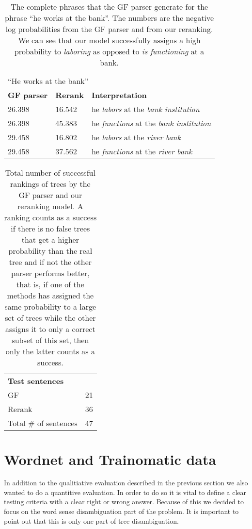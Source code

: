 \begin{table}[htbp]
\centering
\caption{The complete phrases that the GF parser generate for the phrase ``he works at the bank''. The numbers are the negative log probabilities from the GF parser and from our reranking. We can see that our model successfully assigns a high probability to \emph{laboring} as opposed to \emph{is functioning} at a bank.}
\label{tab:worksbank}
\begin{tabular}{lll}
\multicolumn{3}{l}{``He works at the bank''}\\
\textbf{GF parser} & \textbf{Rerank} & \textbf{Interpretation}\\
26.398 & 16.542 & he \emph{labors} at the \emph{bank institution}  \\
26.398 & 45.383 & he \emph{functions} at the \emph{bank institution}\\
29.458 & 16.802 & he \emph{labors} at the \emph{river bank} \\
29.458 & 37.562 & he \emph{functions} at the \emph{river bank}   
\end{tabular}
\end{table}

\begin{table}[htbp]
\centering
\caption{Total number of successful rankings of trees by the GF parser and our reranking model.  A ranking counts as a success if there is no false trees that get a higher probability than the real tree and if not the other parser performs better, that is, if one of the methods has assigned the same probability to a large set of trees while the other assigns it to only a correct subset of this set, then only the latter counts as a success.}
\label{tab:results_summary}
\begin{tabular}{ll}
\multicolumn{2}{l}{\bf Test sentences}\\
GF & 21 \\
Rerank & 36 \\
Total \# of sentences & 47   
\end{tabular}
\end{table}

\section{Wordnet and Trainomatic data}
In addition to the qualitiative evaluation described in the previous section we also wanted to do a quantitive evaluation. In order to do so it is vital to define a clear testing criteria with a clear right or wrong answer. Because of this we decided to focus on the word sense disambiguation part of the problem. It is important to point out that this is only one part of tree disambiguation.

